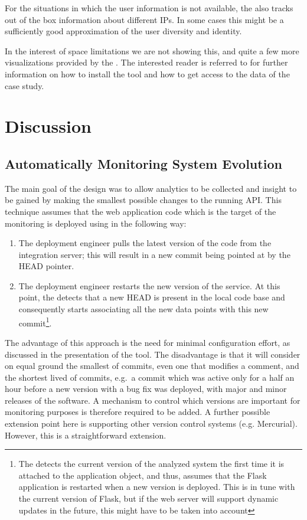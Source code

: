 \documentclass[conference]{IEEEtran}
\begin{document}
  For the situations in which the user information is not available, the \tool also tracks out of the box information about different IPs. In some cases this might be a sufficiently good approximation of the user diversity and identity. 
  
  In the interest of space limitations we are not showing this, and quite a few more visualizations provided by the \tool. The interested reader is referred to  for further information on how to install the tool and how to get access to the data of the case study.

\section{Discussion}

  \subsection{Automatically Monitoring System Evolution}

  The main goal of the \tool design was to allow analytics to be collected and insight to be gained by making the smallest possible changes to the running API. %
%
  This technique assumes that the web application code which is the target of the monitoring is deployed using \git in the following way: 

  \begin{enumerate}
    \item The deployment engineer pulls the latest version of the code from the integration server; this will result in a new commit being pointed at by the HEAD pointer. %
    \item The deployment engineer restarts the new version of the service. At this point, the \tool detects that a new HEAD is present in the local code base and consequently starts associating all the new data points with this new commit\footnote{The \tool detects the current version of the analyzed system the first time it is attached to the application object, and thus, assumes that the Flask application is restarted when a new version is deployed. This is in tune with the current version of Flask, but if the web server will support dynamic updates in the future, this might have to be taken into account}.
  \end{enumerate}

  The advantage of this approach is the need for minimal configuration effort, as discussed in the presentation of the tool. The disadvantage is that it will consider on equal ground the smallest of commits, even one that modifies a comment, and the shortest lived of commits, e.g.~a commit which was active only for a half an hour before a new version with a bug fix was deployed, with major and minor releases of the software. %
  A mechanism to control which versions are important for monitoring purposes is therefore required to be added.
%
  A further possible extension point here is supporting other version control systems (e.g. Mercurial). However, this is a straightforward extension.
\end{document}
